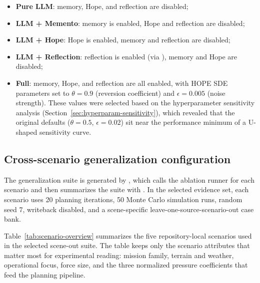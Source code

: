\begin{itemize}
\item \textbf{Pure LLM}: memory, Hope, and reflection are disabled;
\item \textbf{LLM + Memento}: memory is enabled, Hope and reflection are disabled;
\item \textbf{LLM + Hope}: Hope is enabled, memory and reflection are disabled;
\item \textbf{LLM + Reflection}: reflection is enabled (via ), memory and Hope are disabled;
\item \textbf{Full}: memory, Hope, and reflection are all enabled, with HOPE SDE parameters set to $\theta=0.9$ (reversion coefficient) and $\epsilon=0.005$ (noise strength). These values were selected based on the hyperparameter sensitivity analysis (Section~\ref{sec:hyperparam-sensitivity}), which revealed that the original defaults ($\theta=0.5$, $\epsilon=0.02$) sit near the performance minimum of a U-shaped sensitivity curve.
\end{itemize}

\subsection{Cross-scenario generalization configuration}

The generalization suite is generated by , which calls the ablation runner for each scenario and then summarizes the suite with . In the selected evidence set, each scenario uses 20 planning iterations, 50 Monte Carlo simulation runs, random seed 7, writeback disabled, and a scene-specific leave-one-source-scenario-out case bank.

Table~\ref{tab:scenario-overview} summarizes the five repository-local scenarios used in the selected scene-out suite. The table keeps only the scenario attributes that matter most for experimental reading: mission family, terrain and weather, operational focus, force size, and the three normalized pressure coefficients that feed the planning pipeline.

